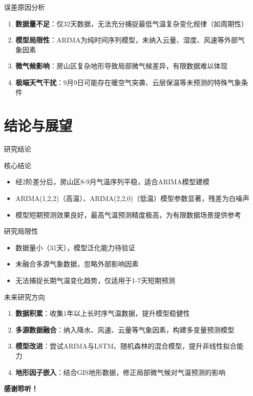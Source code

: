 \begin{frame}{误差原因分析}
    \begin{enumerate}
        \item \textbf{数据量不足}：仅32天数据，无法充分捕捉最低气温复杂变化规律（如周期性）
        \item \textbf{模型局限性}：ARIMA为纯时间序列模型，未纳入云量、湿度、风速等外部气象因素
        \item \textbf{微气候影响}：房山区复杂地形导致局部微气候差异，有限数据难以体现
        \item \textbf{极端天气干扰}：9月9日可能存在暖空气突袭、云层保温等未预测的特殊气象条件
    \end{enumerate}
\end{frame}

\section{结论与展望}
\begin{frame}{研究结论}
    \begin{block}{核心结论}
        \begin{itemize}
            \item 经2阶差分后，房山区8-9月气温序列平稳，适合ARIMA模型建模
            \item ARIMA(1,2,2)（高温）、ARIMA(2,2,0)（低温）模型参数显著，残差为白噪声
            \item 模型短期预测效果良好，最高气温预测精度极高，为有限数据场景提供参考
        \end{itemize}
    \end{block}
    \begin{block}{研究局限性}
        \begin{itemize}
            \item 数据量小（31天），模型泛化能力待验证
            \item 未融合多源气象数据，忽略外部影响因素
            \item 无法捕捉长期气温变化趋势，仅适用于1-7天短期预测
        \end{itemize}
    \end{block}
\end{frame}

\begin{frame}{未来研究方向}
    \begin{enumerate}
        \item \textbf{数据积累}：收集1年以上长时序气温数据，提升模型稳健性
        \item \textbf{多源数据融合}：纳入降水、风速、云量等气象因素，构建多变量预测模型
        \item \textbf{模型改进}：尝试ARIMA与LSTM、随机森林的混合模型，提升非线性拟合能力
        \item \textbf{地形因子嵌入}：结合GIS地形数据，修正局部微气候对气温预测的影响
    \end{enumerate}
    \vspace{2em}
    \centering
    \textbf{感谢聆听！}
\end{frame}